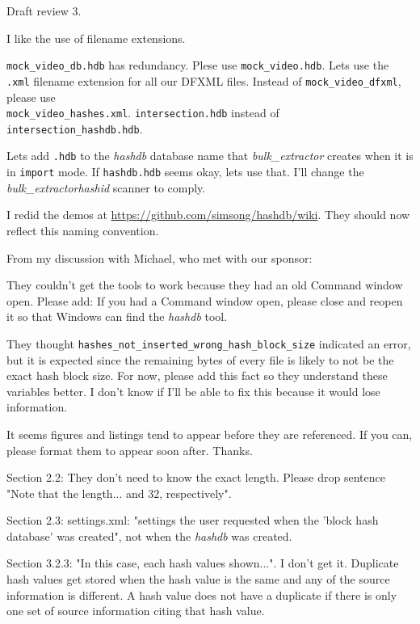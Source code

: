 \documentclass[12pt,twoside]{article}
\newcommand{\hdb}{\emph{hashdb}\xspace}
\newcommand{\bulk}{\emph{bulk\_extractor}\xspace}
\newcommand{\hid}{\emph{hashid}\xspace}
\begin{document}
Draft review 3.

I like the use of filename extensions.

\texttt{mock\_video\_db.hdb} has redundancy.  Plese use
\texttt{mock\_video.hdb}.
Lets use the \texttt{.xml} filename extension for all our DFXML files.
Instead of \texttt{mock\_video\_dfxml}, please use \\
\texttt{mock\_video\_hashes.xml}.
\texttt{intersection.hdb} instead of \texttt{intersection\_hashdb.hdb}.

Lets add \texttt{.hdb} to the \hdb database name that \bulk creates
when it is in \texttt{import} mode.
If \texttt{hashdb.hdb} seems okay, lets use that.
I'll change the \bulk \hid scanner to comply.

I redid the demos at
\url{https://github.com/simsong/hashdb/wiki}.
They should now reflect this naming convention.

From my discussion with Michael, who met with our sponsor:
\begin{compactitem}
\item They couldn't get the tools to work
because they had an old Command window open.
Please add: If you had a Command window open,
please close and reopen it so that Windows can find the \hdb tool.
\item They thought \texttt{hashes\_not\_inserted\_wrong\_hash\_block\_size}
indicated an error, but it is expected
since the remaining bytes of every file is likely to not be the exact
hash block size.
For now, please add this fact so they understand these variables better.
I don't know if I'll be able to fix this because it would lose information.
\end{compactitem}

It seems figures and listings tend to appear before they are referenced.
If you can, please format them to appear soon after.  Thanks.

Section 2.2: They don't need to know the exact length.
Please drop sentence "Note that the length... and 32, respectively".

Section 2.3: settings.xml: "settings the user requested
when the 'block hash database' was created", not when the \hdb was created.

Section 3.2.3: "In this case, each hash values shown...".
I don't get it.
Duplicate hash values get stored when the hash value is the same
and any of the source information is different.
A hash value does not have a duplicate if there is only one set of source
information citing that hash value.
\end{document}

